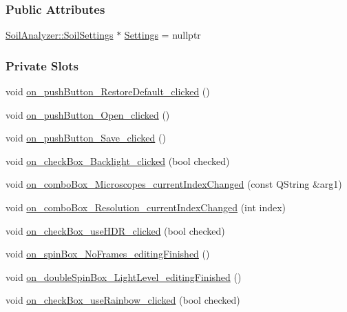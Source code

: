 \subsubsection*{Public Attributes}
\begin{DoxyCompactItemize}
\item 
\hyperlink{class_soil_analyzer_1_1_soil_settings}{Soil\+Analyzer\+::\+Soil\+Settings} $\ast$ \hyperlink{class_dialog_settings_ae6b9e42f9108f93c4964be28a7171648}{Settings} = nullptr
\end{DoxyCompactItemize}
\subsubsection*{Private Slots}
\begin{DoxyCompactItemize}
\item 
void \hyperlink{class_dialog_settings_aae514236719c387d1922402298733660}{on\+\_\+push\+Button\+\_\+\+Restore\+Default\+\_\+clicked} ()
\item 
void \hyperlink{class_dialog_settings_a46d3655796593684cd5949aeae57c6d5}{on\+\_\+push\+Button\+\_\+\+Open\+\_\+clicked} ()
\item 
void \hyperlink{class_dialog_settings_a2f04e1b1d30db8197db4de03bea63a87}{on\+\_\+push\+Button\+\_\+\+Save\+\_\+clicked} ()
\item 
void \hyperlink{class_dialog_settings_a32f4763290f97febfa34bcdcd2dc9432}{on\+\_\+check\+Box\+\_\+\+Backlight\+\_\+clicked} (bool checked)
\item 
void \hyperlink{class_dialog_settings_adeb3fcea2cf71899e5f9dd184421c131}{on\+\_\+combo\+Box\+\_\+\+Microscopes\+\_\+current\+Index\+Changed} (const Q\+String \&arg1)
\item 
void \hyperlink{class_dialog_settings_a523a72d25bd4c7623cf8164cb73736d5}{on\+\_\+combo\+Box\+\_\+\+Resolution\+\_\+current\+Index\+Changed} (int index)
\item 
void \hyperlink{class_dialog_settings_ae1c807192ce7c417cb7c742d7aa2a4c7}{on\+\_\+check\+Box\+\_\+use\+H\+D\+R\+\_\+clicked} (bool checked)
\item 
void \hyperlink{class_dialog_settings_ada2cc4ec4579282cd5045e3f77e99aeb}{on\+\_\+spin\+Box\+\_\+\+No\+Frames\+\_\+editing\+Finished} ()
\item 
void \hyperlink{class_dialog_settings_a761f7eced4cbb72a9585dd2bc344a767}{on\+\_\+double\+Spin\+Box\+\_\+\+Light\+Level\+\_\+editing\+Finished} ()
\item 
void \hyperlink{class_dialog_settings_a44848ea27b02c9c948e9a51beddd28a4}{on\+\_\+check\+Box\+\_\+use\+Rainbow\+\_\+clicked} (bool checked)

\end{DoxyCompactItemize}
